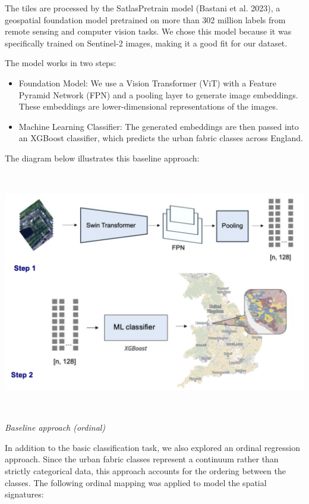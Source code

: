 \documentclass[
  letterpaper,
  DIV=11,
  numbers=noendperiod]{scrartcl}
\providecommand{\tightlist}{%
  \setlength{\itemsep}{0pt}\setlength{\parskip}{0pt}}\usepackage{longtable,booktabs,array}
\begin{document}
The tiles are processed by the SatlasPretrain model (Bastani et al.
2023), a geospatial foundation model pretrained on more than 302 million
labels from remote sensing and computer vision tasks. We chose this
model because it was specifically trained on Sentinel-2 images, making
it a good fit for our dataset.

The model works in two steps:

\begin{itemize}
\tightlist
\item
  Foundation Model: We use a Vision Transformer (ViT) with a Feature
  Pyramid Network (FPN) and a pooling layer to generate image
  embeddings. These embeddings are lower-dimensional representations of
  the images.
\item
  Machine Learning Classifier: The generated embeddings are then passed
  into an XGBoost classifier, which predicts the urban fabric classes
  across England.
\end{itemize}

The diagram below illustrates this baseline approach: \begin{center}
\includegraphics[width=\linewidth,height=4.16667in,keepaspectratio]{../figures/algo_design/baseline.png}
\end{center}

\emph{Baseline approach (ordinal)}

In addition to the basic classification task, we also explored an
ordinal regression approach. Since the urban fabric classes represent a
continuum rather than strictly categorical data, this approach accounts
for the ordering between the classes. The following ordinal mapping was
applied to model the spatial signatures:
\end{document}
